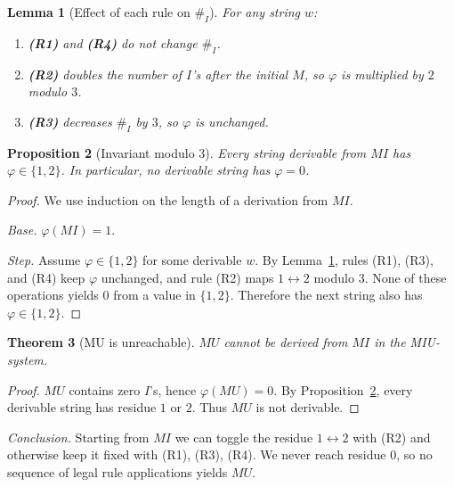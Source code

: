 \documentclass{article}
\theoremstyle{theorem}
\newtheorem{theorem}{Theorem}[section]
\newtheorem{lemma}[theorem]{Lemma}
\newtheorem{proposition}[theorem]{Proposition}
\theoremstyle{definition}
\theoremstyle{remark}
\begin{document}
\begin{lemma}[Effect of each rule on $\#_I$]\label{lem:rule-effects}
For any string $w$:
\begin{enumerate}
    \item \textbf{(R1)} and \textbf{(R4)} do not change $\#_I$.
    \item \textbf{(R2)} doubles the number of $I$’s \emph{after} the initial $M$, so $\varphi$ is multiplied by $2$ modulo $3$.
    \item \textbf{(R3)} decreases $\#_I$ by $3$, so $\varphi$ is unchanged.
\end{enumerate}
\end{lemma}

\begin{proposition}[Invariant modulo $3$]\label{prop:invariant}
Every string derivable from $MI$ has $\varphi\in\{1,2\}$. In particular, no derivable string has $\varphi=0$.
\end{proposition}

\begin{proof}
We use induction on the length of a derivation from $MI$.

\emph{Base.} $\varphi(MI)=1$.

\emph{Step.} Assume $\varphi\in\{1,2\}$ for some derivable $w$.  
By Lemma~\ref{lem:rule-effects}, rules (R1), (R3), and (R4) keep $\varphi$ unchanged, and rule (R2) maps $1\leftrightarrow 2$ modulo $3$. None of these operations yields $0$ from a value in $\{1,2\}$. Therefore the next string also has $\varphi\in\{1,2\}$.
\end{proof}

\begin{theorem}[MU is unreachable]
\label{thm:mu-unreachable}
$MU$ cannot be derived from $MI$ in the MIU-system.
\end{theorem}

\begin{proof}
$MU$ contains zero $I$’s, hence $\varphi(MU)=0$. By Proposition~\ref{prop:invariant}, every derivable string has residue $1$ or $2$. Thus $MU$ is not derivable.
\end{proof}

\textit{Conclusion.} Starting from $MI$ we can toggle the residue $1\leftrightarrow 2$ with (R2) and otherwise keep it fixed with (R1), (R3), (R4). We never reach residue $0$, so no sequence of legal rule applications yields $MU$.
\end{document}
